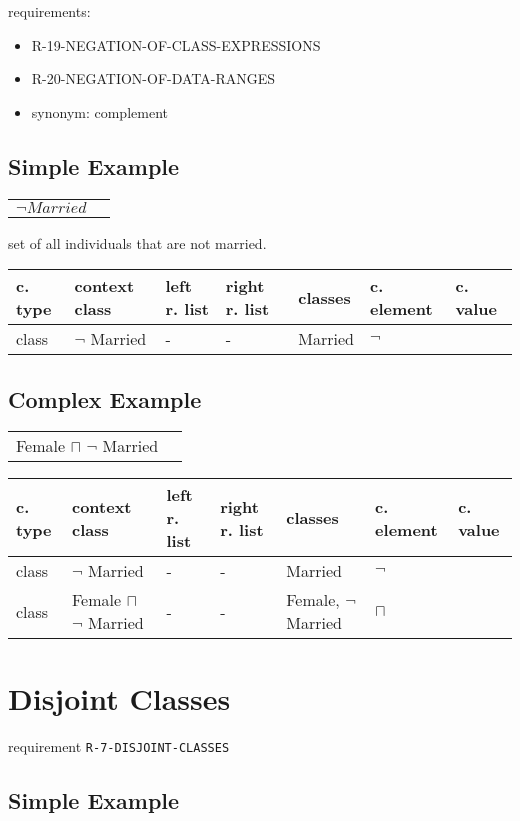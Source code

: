 \documentclass{llncs}
\newcommand{\ms}[1]{\texttt{#1}}
\newenvironment{gcotable}{
  \scriptsize
  \sffamily
  \vspace{0.3cm}
	\begin{center}
  \begin{tabular}{l|l|l|l|l|l|l}
  \hline
  \textbf{c. type} & \textbf{context class} & \textbf{left r. list} & \textbf{right r. list} & \textbf{classes} & \textbf{c. element} & \textbf{c. value} \\
  \hline

}{
  \hline
  \end{tabular}
	\end{center}
}
\newenvironment{DL}{
	\begin{center}
  \begin{tabular}{r l}

}{
  \end{tabular}
	\end{center}
}
\begin{document}
requirements:

\begin{itemize}
  \item R-19-NEGATION-OF-CLASS-EXPRESSIONS
	\item R-20-NEGATION-OF-DATA-RANGES
\end{itemize}



\begin{itemize}
	\item synonym: complement
\end{itemize}

\subsection{Simple Example}

\begin{DL}
$ \neg Married $ \\ 
\end{DL}

set of all individuals that are not married.

\begin{gcotable}
class & $\neg$ Married & - & - & Married & $\neg$ \\
\end{gcotable}

\subsection{Complex Example}

\begin{DL}
Female $\sqcap$ $\neg$ Married \\
\end{DL}

\begin{gcotable}
class & $\neg$ Married & - & - & Married & $\neg$ \\
class & Female $\sqcap$ $\neg$ Married & - & - & Female, $\neg$ Married & $\sqcap$ \\
\end{gcotable}

\section{Disjoint Classes}

requirement \ms{R-7-DISJOINT-CLASSES}

\subsection{Simple Example}
\end{document}
